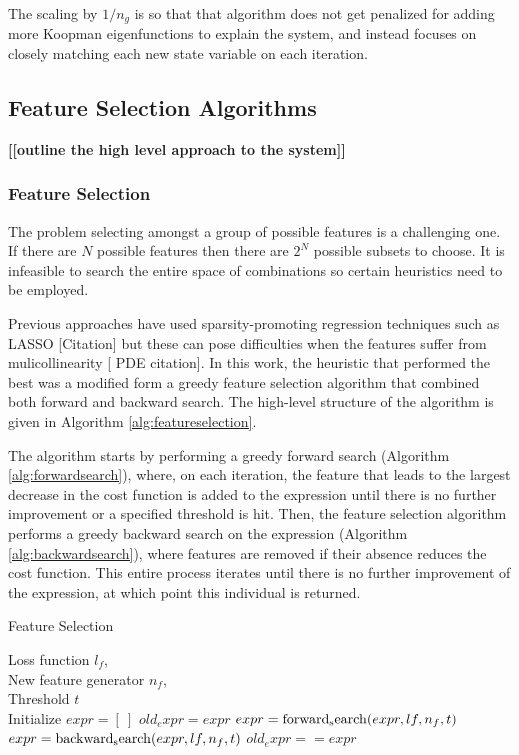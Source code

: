 \documentclass{article}
\newcommand{\todo}[1]{\textbf{[[#1]]}}
\begin{document}
The scaling by $1/n_g$ is so that that algorithm does not get penalized for adding more Koopman eigenfunctions to explain the system, and instead focuses on closely matching each new state variable on each iteration.


\subsection{Feature Selection Algorithms}

\todo{outline the high level approach to the system}

\subsubsection{Feature Selection}
The problem selecting amongst a group of possible features is a challenging one. If there are $N$ possible features then there are $2^N$ possible subsets to choose. It is infeasible to search the entire space of combinations so certain heuristics need to be employed. 

Previous approaches have used sparsity-promoting regression techniques such as LASSO [Citation] but these can pose difficulties when the features suffer from mulicollinearity [ PDE citation]. In this work, the heuristic that performed the best was a modified form a greedy feature selection algorithm that combined both forward and backward search. The high-level structure of the algorithm is given in Algorithm \ref{alg:featureselection}.

The algorithm starts by performing a greedy forward search (Algorithm \ref{alg:forwardsearch}), where, on each iteration, the feature that leads to the largest decrease in the cost function is added to the expression until there is no further improvement or a specified threshold is hit. Then, the feature selection algorithm performs a greedy backward search on the expression (Algorithm \ref{alg:backwardsearch}), where features are removed if their absence reduces the cost function. This entire process iterates until there is no further improvement of the expression, at which point this individual is returned.

\begin{algorithm}[tb]
   \caption{Feature Selection}
   \label{alg:featureselection}
\begin{algorithmic}
    Loss function $l_f$, \\
   \quad \quad \quad New feature generator $n_f$, \\
   \quad \quad \quad Threshold $t$ \\
   \STATE Initialize $expr = [ \ ]$
   \REPEAT
   \STATE $old_expr = expr$
   \STATE $expr = {\rm forward_search}(expr, lf, n_f, t)$
   \STATE $expr = {\rm backward_search}(expr, lf, n_f, t)$
   \UNTIL $old_expr == expr$
\end{algorithmic}
\end{algorithm}
\end{document}
